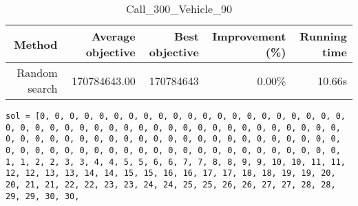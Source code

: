 \begin{table}[ht]
\centering
\caption{Call\_300\_Vehicle\_90}
\label{tab:call300vehicle90}
\begin{tabular}{|r|r|r|r|r|}
Method & Average objective & Best objective & Improvement (\%) & Running time \\
\hline
Random search & 170784643.00 & 170784643 & 0.00\% & 10.66s\\
\end{tabular}
\end{table}
\begin{lstlisting}[label={lst:call300vehicle90},caption=Optimal solution call\_300\_vehicle\_90]
sol = [0, 0, 0, 0, 0, 0, 0, 0, 0, 0, 0, 0, 0, 0, 0, 0, 0, 0, 0, 0, 0, 0, 0, 0, 0, 0, 0, 0, 0, 0, 0, 0, 0, 0, 0, 0, 0, 0, 0, 0, 0, 0, 0, 0, 0, 0, 0, 0, 0, 0, 0, 0, 0, 0, 0, 0, 0, 0, 0, 0, 0, 0, 0, 0, 0, 0, 0, 0, 0, 0, 0, 0, 0, 0, 0, 0, 0, 0, 0, 0, 0, 0, 0, 0, 0, 0, 0, 0, 0, 0, 1, 1, 2, 2, 3, 3, 4, 4, 5, 5, 6, 6, 7, 7, 8, 8, 9, 9, 10, 10, 11, 11, 12, 12, 13, 13, 14, 14, 15, 15, 16, 16, 17, 17, 18, 18, 19, 19, 20, 20, 21, 21, 22, 22, 23, 23, 24, 24, 25, 25, 26, 26, 27, 27, 28, 28, 29, 29, 30, 30,

\end{lstlisting}
